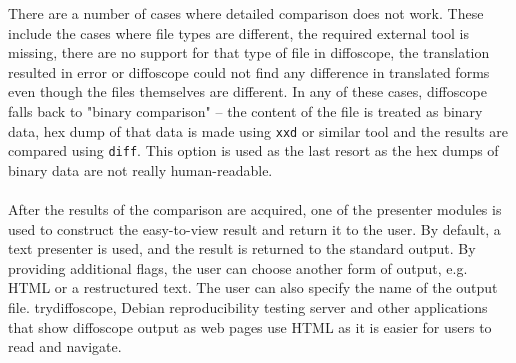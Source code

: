 There are a number of cases where detailed comparison does not work. These include the cases where file types are different, the required external tool is missing, there are no support for that type of file in diffoscope, the translation resulted in error or diffoscope could not find any difference in translated forms even though the files themselves are different. In any of these cases, diffoscope falls back to "binary comparison" -- the content of the file is treated as binary data, hex dump of that data is made using \texttt{xxd} or similar tool and the results are compared using \texttt{diff}. This option is used as the last resort as the hex dumps of binary data are not really human-readable.\\\\
After the results of the comparison are acquired, one of the presenter modules is used to construct the easy-to-view result and return it to the user. By default, a text presenter is used, and the result is returned to the standard output. By providing additional flags, the user can choose another form of output, e.g. HTML or a restructured text. The user can also specify the name of the output file. trydiffoscope, Debian reproducibility testing server and other applications that show diffoscope output as web pages use HTML as it is easier for users to read and navigate.


